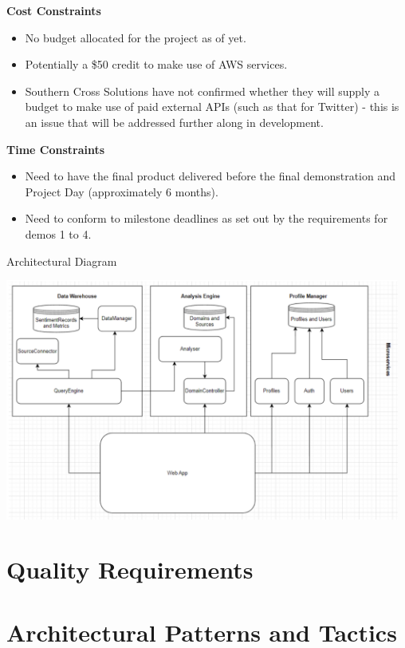 \documentclass[12pt]{article}
\begin{document}
\textbf{Cost Constraints}
\begin{itemize}
  \item No budget allocated for the project as of yet.
  \item Potentially a \$50 credit to make use of AWS services.
  \item Southern Cross Solutions have not confirmed whether they will supply a budget to make use of paid external APIs (such as that for Twitter) - this is an issue that will be addressed further along in development.
\end{itemize}

\textbf{Time Constraints}
\begin{itemize}
  \item Need to have the final product delivered before the final demonstration and Project Day (approximately 6 months).
  \item Need to conform to milestone deadlines as set out by the requirements for demos 1 to 4.
\end{itemize}

Architectural Diagram

\begin{center}
  \includegraphics[width=13cm]{../../Images/pic.png}

\end{center}
\newpage

\section{Quality Requirements}

\newpage

\section{Architectural Patterns and Tactics}
\end{document}
